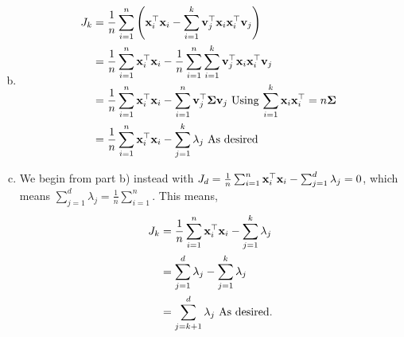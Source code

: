 \documentclass[12pt,letterpaper,fleqn]{hmcpset}
\begin{document}
\begin{solution}
\begin{enumerate}[(a)]
\begin{align*}
            \end{align*}
        \item
            \begin{align*}
                J_k &= \frac{1}{n}\sum_{i=1}^n \left({\bf x}_i^\top {\bf x}_i - \sum_{i=1}^k{\bf v}_j^\top {\bf x}_i{\bf x}_i^\top {\bf v}_j\right)\\
                &= \frac{1}{n}\sum_{i=1}^n {\bf x}_i^\top {\bf x}_i - \frac{1}{n}\sum_{i=1}^n \sum_{i=1}^k{\bf v}_j^\top {\bf x}_i{\bf x}_i^\top {\bf v}_j\\
                &= \frac{1}{n}\sum_{i=1}^n {\bf x}_i^\top {\bf x}_i - \sum_{i=1}^n {\bf v}_j^\top \hbox{\boldmath$\Sigma$} {\bf v}_j \text{ Using $\sum_{i=1}^k {\bf x}_i{\bf x}_i^\top = n\hbox{\boldmath$\Sigma$}$ }\\
                &= \frac{1}{n}\sum_{i=1}^n {\bf x}_i^\top{\bf x}_i - \sum_{j=1}^k\lambda_j \text{ As desired}
            \end{align*}           
        \item
        We begin from part b) instead with $J_d = \frac{1}{n}\sum_{i=1}^n {\bf x}_i^\top{\bf x}_i - \sum_{j=1}^d\lambda_j = 0$, which means $\sum_{j=1}^d\lambda_j = \frac{1}{n}\sum_{i=1}^n$. This means,
        \begin{align*}
            J_k  &= \frac{1}{n}\sum_{i=1}^n {\bf x}_i^\top{\bf x}_i - \sum_{j=1}^k\lambda_j\\
            &= \sum_{j=1}^d\lambda_j - \sum_{j=1}^k\lambda_j \\
            &= \sum_{j=k+1}^d\lambda_j \text{ As desired.}
        \end{align*}
            
    \end{enumerate}
\end{solution}
\end{document}
